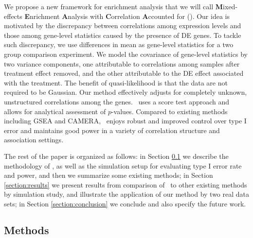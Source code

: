 	
	
	We propose a new framework for enrichment analysis that we will call \textbf{M}ixed-effects 
	\textbf{E}nrichment \textbf{A}nalysis with \textbf{C}orrelation \textbf{A}ccounted for 
	(\OurMethod). Our idea is motivated by the discrepancy between correlations
	among expression levels and those among gene-level statistics caused by the presence of DE 
	genes. To tackle such discrepancy, we use differences in mean as gene-level statistics for a 
	two group comparison experiment. We model the covariance of gene-level statistics by two 
	variance components, one attributable to correlations among samples after treatment effect 
	removed, and the other attributable to the DE effect associated with the treatment. The benefit 
	of quasi-likelihood is that the data are not required to be Gaussian. Our method effectively 
	adjusts for completely unknown,	unstructured correlations among the genes. \OurMethod~uses a 
	score test approach and allows for analytical assessment of $p$-values. Compared to existing 
	methods including GSEA and CAMERA, \OurMethod~enjoys robust and improved control over type I 
	error and maintains good power in a	variety of correlation structure and association settings. 
	
	The rest of the paper is organized as follows: in Section \ref{section:methods} we describe the
	methodology of \OurMethod, as well as the simulation setup for evaluating type I error rate and 
	power, and then we summarize some existing methods; in
	Section \ref{section:results} we present results from comparison of \OurMethod~to other existing
	methods by simulation study, and illustrate the application of our method by two real data 
	sets; in Section \ref{section:conclusion} we conclude and also specify the future work.
	
	
	
	\subsection{Methods}\label{section:methods}
		
